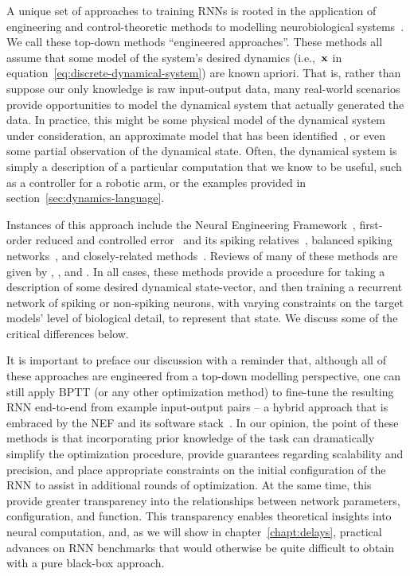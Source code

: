 A unique set of approaches to training RNNs is rooted in the application of engineering and control-theoretic methods to modelling neurobiological systems~\citep{eliasmith1999developing}.
We call these top-down methods ``engineered approaches''.
These methods all assume that some model of the system's desired dynamics (i.e.,~$\mathbf{x}$ in equation~\ref{eq:discrete-dynamical-system}) are known apriori.
That is, rather than suppose our only knowledge is raw input-output data, many real-world scenarios provide opportunities to model the dynamical system that actually generated the data.
In practice, this might be some physical model of the dynamical system under consideration, an approximate model that has been identified~\citep{nelles2013nonlinear}, or even some partial observation of the dynamical state.
Often, the dynamical system is simply a description of a particular computation that we know to be useful, such as a controller for a robotic arm, or the examples provided in section~\ref{sec:dynamics-language}.

Instances of this approach include the Neural Engineering Framework~\citep[NEF;][]{eliasmith2003a, duggins2017incorporating}, first-order reduced and controlled error~\citep[FORCE;][]{sussillo2009generating, depasquale2018full} and its spiking relatives~\citep{thalmeier2016learning, depasquale2016using}, balanced spiking networks~\citep{boerlin2011spike, boerlin2013predictive, schwemmer2015constructing, alemi2018learning}, and closely-related methods~\citep{jaeger2014controlling, gilra2017predicting}.
Reviews of many of these methods are given by \citet{deneve2016efficient}, \citet{abbott2016building}, and \citet{nicola2016supervised}.
In all cases, these methods provide a procedure for taking a description of some desired dynamical state-vector, and then training a recurrent network of spiking or non-spiking neurons, with varying constraints on the target models' level of biological detail, to represent that state.
We discuss some of the critical differences below.

It is important to preface our discussion with a reminder that, although all of these approaches are engineered from a top-down modelling perspective, one can still apply BPTT (or any other optimization method) to fine-tune the resulting RNN end-to-end from example input-output pairs -- a hybrid approach that is embraced by the NEF and its software stack~\citep{rasmussen2018nengodl}.
In our opinion, the point of these methods is that incorporating prior knowledge of the task can dramatically simplify the optimization procedure, provide guarantees regarding scalability and precision, and place appropriate constraints on the initial configuration of the RNN to assist in additional rounds of optimization.
At the same time, this provide greater transparency into the relationships between network parameters, configuration, and function.
This transparency enables theoretical insights into neural computation, and, as we will show in chapter~\ref{chapt:delays}, practical advances on RNN benchmarks that would otherwise be quite difficult to obtain with a pure black-box approach.


